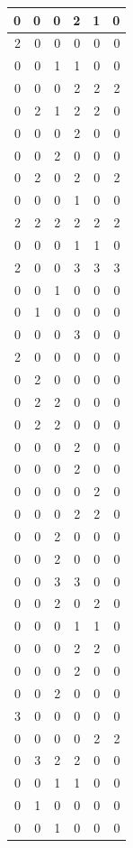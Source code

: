 \documentclass[
  12pt,
]{krantz}
\begin{document}
\begin{tabular}{r|r|r|r|r|r}
\hline
0 & 0 & 0 & 2 & 1 & 0\\
\hline
2 & 0 & 0 & 0 & 0 & 0\\
\hline
0 & 0 & 1 & 1 & 0 & 0\\
\hline
0 & 0 & 0 & 2 & 2 & 2\\
\hline
0 & 2 & 1 & 2 & 2 & 0\\
\hline
0 & 0 & 0 & 2 & 0 & 0\\
\hline
0 & 0 & 2 & 0 & 0 & 0\\
\hline
0 & 2 & 0 & 2 & 0 & 2\\
\hline
0 & 0 & 0 & 1 & 0 & 0\\
\hline
2 & 2 & 2 & 2 & 2 & 2\\
\hline
0 & 0 & 0 & 1 & 1 & 0\\
\hline
2 & 0 & 0 & 3 & 3 & 3\\
\hline
0 & 0 & 1 & 0 & 0 & 0\\
\hline
0 & 1 & 0 & 0 & 0 & 0\\
\hline
0 & 0 & 0 & 3 & 0 & 0\\
\hline
2 & 0 & 0 & 0 & 0 & 0\\
\hline
0 & 2 & 0 & 0 & 0 & 0\\
\hline
0 & 2 & 2 & 0 & 0 & 0\\
\hline
0 & 2 & 2 & 0 & 0 & 0\\
\hline
0 & 0 & 0 & 2 & 0 & 0\\
\hline
0 & 0 & 0 & 2 & 0 & 0\\
\hline
0 & 0 & 0 & 0 & 2 & 0\\
\hline
0 & 0 & 0 & 2 & 2 & 0\\
\hline
0 & 0 & 2 & 0 & 0 & 0\\
\hline
0 & 0 & 2 & 0 & 0 & 0\\
\hline
0 & 0 & 3 & 3 & 0 & 0\\
\hline
0 & 0 & 2 & 0 & 2 & 0\\
\hline
0 & 0 & 0 & 1 & 1 & 0\\
\hline
0 & 0 & 0 & 2 & 2 & 0\\
\hline
0 & 0 & 0 & 2 & 0 & 0\\
\hline
0 & 0 & 2 & 0 & 0 & 0\\
\hline
3 & 0 & 0 & 0 & 0 & 0\\
\hline
0 & 0 & 0 & 0 & 2 & 2\\
\hline
0 & 3 & 2 & 2 & 0 & 0\\
\hline
0 & 0 & 1 & 1 & 0 & 0\\
\hline
0 & 1 & 0 & 0 & 0 & 0\\
\hline
0 & 0 & 1 & 0 & 0 & 0\\

\end{tabular}
\end{document}
